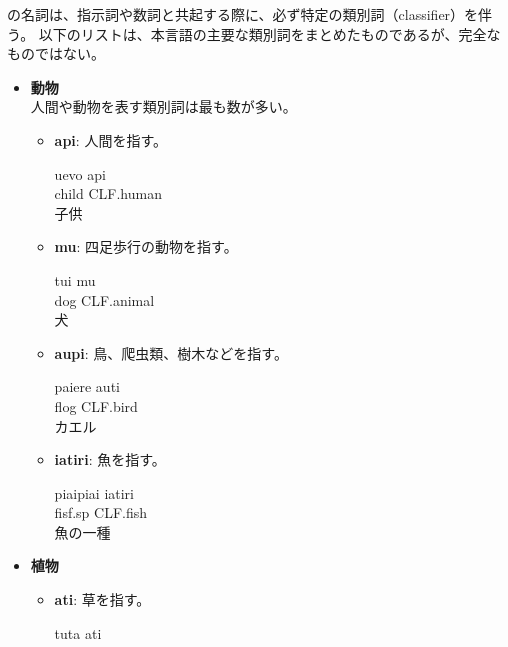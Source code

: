 \langname の名詞は、指示詞や数詞と共起する際に、必ず特定の類別詞（classifier）を伴う。
以下のリストは、本言語の主要な類別詞をまとめたものであるが、完全なものではない。
\begin{itemize}
    \item \textbf{動物}\\
    人間や動物を表す類別詞は最も数が多い。
        \begin{itemize}
            \item \textbf{api}: 人間を指す。
                \begin{exe}
                    \ex \gll uevo api \\
                        child CLF.human \\
                        \glt 子供
                \end{exe}
            \item \textbf{mu}: 四足歩行の動物を指す。
                \begin{exe}
                    \ex \gll tui mu \\
                        dog CLF.animal \\
                        \glt 犬
                \end{exe}
            \item \textbf{aupi}: 鳥、爬虫類、樹木などを指す。
                \begin{exe}
                    \ex \gll paiere auti \\
                        flog CLF.bird \\
                        \glt カエル
                \end{exe}
            \item \textbf{iatiri}: 魚を指す。
                \begin{exe}
                    \ex \gll piaipiai iatiri \\
                        fisf.sp CLF.fish \\ %
                        \glt 魚の一種
                \end{exe}
        \end{itemize}
    \item \textbf{植物}
        \begin{itemize}
            \item \textbf{ati}: 草を指す。
                \begin{exe}
                    \ex \gll tuta ati \\

\end{exe}
\end{itemize}
\end{itemize}
